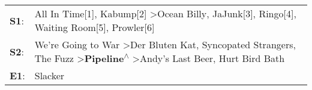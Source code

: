 \begin{supertabular}{p{0.03\textwidth}p{0.92\textwidth}}
 \textbf{S1}:  &                                                                 All In Time[1]\textsuperscript{}, \enspace Kabump[2]\textsuperscript{} \textgreater \enspace Ocean Billy\textsuperscript{}, \enspace JaJunk[3]\textsuperscript{}, \enspace Ringo[4]\textsuperscript{}, \enspace Waiting Room[5]\textsuperscript{}, \enspace Prowler[6]\textsuperscript{}  \enspace  \\
 \textbf{S2}:  &  We're Going to War\textsuperscript{} \textgreater \enspace Der Bluten Kat\textsuperscript{}, \enspace Syncopated Strangers\textsuperscript{}, \enspace The Fuzz\textsuperscript{} \textgreater \enspace \textbf{Pipeline\textsuperscript{$\wedge$}} \textgreater \enspace Andy's Last Beer\textsuperscript{}, \enspace Hurt Bird Bath\textsuperscript{}  \enspace  \\
 \textbf{E1}:  &                                                                                                                                                                                                                                                                                                                                Slacker\textsuperscript{}  \enspace  \\
\end{supertabular}

